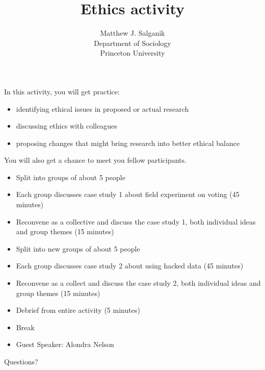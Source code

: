 \documentclass{beamer}
\title[]{Ethics activity}
\author[]{Matthew J. Salganik\\Department of Sociology\\Princeton University}
\date[]{Summer Institutes in Computational Social Science\\June 17, 2019
\vfill
\begin{flushleft}
{\scriptsize
The Summer Institute in Computational Social Science is supported by grants from the Russell Sage Foundation and the Alfred P. Sloan Foundation.}
\end{flushleft}
\begin{flushright}
\vspace{0.1in}
\texttt{[image: figures/cc-by.png]}
\end{flushright}
}
\begin{document}
\frame{\titlepage}
\begin{frame}

In this activity, you will get practice:
\begin{itemize}
\item identifying ethical issues in proposed or actual research
\pause
\item discussing ethics with colleagues
\pause
\item proposing changes that might bring research into better ethical balance
\end{itemize}
\pause
\vfill
You will also get a chance to meet you fellow participants.

\end{frame}
\begin{frame}

\begin{itemize}
\item Split into groups of about 5 people
\pause
\item Each group discusses case study 1 about field experiment on voting (45 minutes)
\pause
\item Reconvene as a collective and discuss the case study 1, both individual ideas and group themes (15 minutes)
\pause
\item Split into new groups of about 5 people
\pause
\item Each group discusses case study 2 about using hacked data (45 minutes)
\pause
\item Reconvene as a collect and discuss the case study 2, both individual ideas and group themes (15 minutes)
\pause
\item Debrief from entire activity (5 minutes)
\pause
\item Break
\pause
\item Guest Speaker: Alondra Nelson
\end{itemize}

\end{frame}
\begin{frame}

\begin{center}
\LARGE
Questions?
\end{center}

\end{frame}
\end{document}
